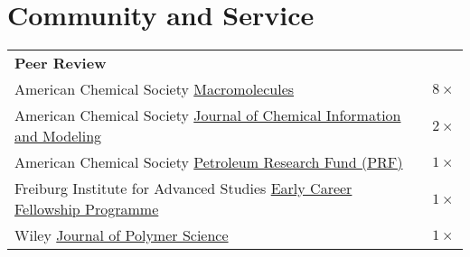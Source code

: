 \documentclass[letterpaper,11pt]{article}
\begin{document}
\section*{Community and Service}
\vspace{-0.6\baselineskip}
\begin{longtable}{@{}p{}r@{}}
  \multicolumn{2}{l}{\hspace{-3mm} \bf{Peer Review}} 			                                                                                                                                                                                                                               \\
  \hspace{3mm} \small American Chemical Society \href{https://pubs.acs.org/journal/mamobx}{Macromolecules}                                                                                                               & $8\times$                                                                   \\
  \hspace{3mm} \small American Chemical Society \href{https://pubs.acs.org/journal/jcisd8}{Journal of Chemical Information and Modeling}                                                                                 & $2\times$                                                                   \\
  \hspace{3mm} \small American Chemical Society \href{https://www.acs.org/funding/grants/petroleum-research-fund.html}{Petroleum Research Fund (PRF)}                                                                    & $1\times$                                                                   \\
  \hspace{3mm} \small Freiburg Institute for Advanced Studies \href{https://www.frias.uni-freiburg.de/en/funding-programmes/frias-fellowships}{Early Career Fellowship Programme}                                        & $1\times$                                                                   \\
  \hspace{3mm} \small Wiley \href{https://onlinelibrary.wiley.com/journal/26424169}{Journal of Polymer Science}                                                                                                          & $1\times$                                                                   \\ [4pt]

\end{longtable}
\end{document}
